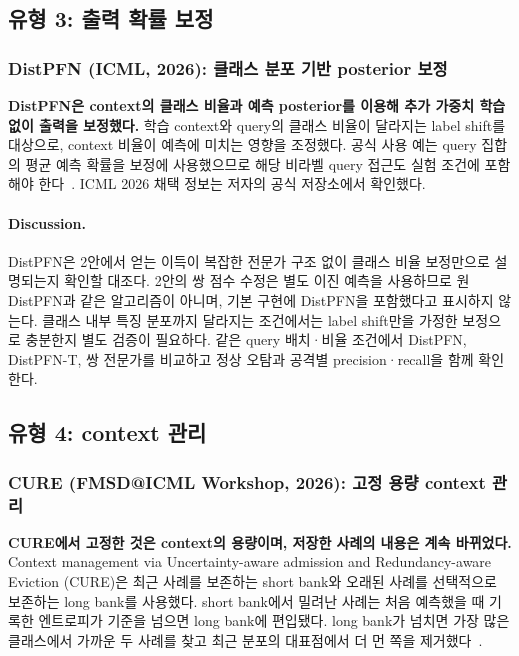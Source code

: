 \clearpage
\subsection{유형 3: 출력 확률 보정}
\subsubsection{DistPFN (ICML, 2026): 클래스 분포 기반 posterior 보정}
\textbf{DistPFN은 context의 클래스 비율과 예측 posterior를 이용해 추가 가중치 학습 없이 출력을 보정했다.} 학습 context와 query의 클래스 비율이 달라지는 label shift를 대상으로, context 비율이 예측에 미치는 영향을 조정했다. 공식 사용 예는 query 집합의 평균 예측 확률을 보정에 사용했으므로 해당 비라벨 query 접근도 실험 조건에 포함해야 한다~\cite{distpfn,distcode}. ICML 2026 채택 정보는 저자의 공식 저장소에서 확인했다.


\paragraph{Discussion.}
DistPFN은 2안에서 얻는 이득이 복잡한 전문가 구조 없이 클래스 비율 보정만으로 설명되는지 확인할 대조다. 2안의 쌍 점수 수정은 별도 이진 예측을 사용하므로 원 DistPFN과 같은 알고리즘이 아니며, 기본 구현에 DistPFN을 포함했다고 표시하지 않는다. 클래스 내부 특징 분포까지 달라지는 조건에서는 label shift만을 가정한 보정으로 충분한지 별도 검증이 필요하다. 같은 query 배치·비율 조건에서 DistPFN, DistPFN-T, 쌍 전문가를 비교하고 정상 오탐과 공격별 precision·recall을 함께 확인한다.

\subsection{유형 4: context 관리}
\subsubsection{CURE (FMSD@ICML Workshop, 2026): 고정 용량 context 관리}
\textbf{CURE에서 고정한 것은 context의 용량이며, 저장한 사례의 내용은 계속 바뀌었다.} Context management via Uncertainty-aware admission and Redundancy-aware Eviction (CURE)은 최근 사례를 보존하는 short bank와 오래된 사례를 선택적으로 보존하는 long bank를 사용했다. short bank에서 밀려난 사례는 처음 예측했을 때 기록한 엔트로피가 기준을 넘으면 long bank에 편입됐다. long bank가 넘치면 가장 많은 클래스에서 가까운 두 사례를 찾고 최근 분포의 대표점에서 더 먼 쪽을 제거했다~\cite{cure}.

